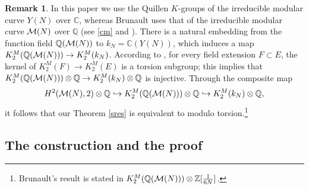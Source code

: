 \documentclass[12pt,amstex,amssymb]{article}
\theoremstyle{plain}
\theoremstyle{definition}
\newtheorem{remark}[theorem]{Remark}
\def\cM{{\cal M}}
\def\Z{{\mathbb Z}}
\def\C{{\mathbb C}}
\def\Q{{\mathbb Q}}
\newcommand{\ba}{\mathbf{a}}
\begin{document}
\begin{remark}
In this paper we use the Quillen $K$-groups of the irreducible modular curve $Y(N)$ over $\C$, whereas  Brunault \cite{Bru} uses that of the irreducible modular curve $\cM(N)$ over $\Q$ (see \eqref{cm} and \cite[p. 2]{Bru}). There is a natural embedding from the function field $\Q(\cM(N))$ to $k_N=\C(Y(N))$, which induces a map $K_2^M(\Q(\cM(N))) \to K_2^M(k_N)$. According to \cite[Lemma 6.1.3, Chap 3]{Weibel}, for every field extension $F \subset E$, the kernel of $K_2^M(F) \to K_2^M(E)$
is a torsion subgroup; this implies that $K_2^M(\Q(\cM(N)))\otimes \Q \to K_2^M(k_N)\otimes \Q$ is injective. Through the composite map $$H^2(\cM(N),2)\otimes \Q \hookrightarrow K_2^M(\Q(\cM(N)))\otimes \Q \hookrightarrow K_2^M(k_N)\otimes \Q,$$ it follows that our Theorem \ref{sres} is equivalent to \cite[Theorem 4.1]{Bru2} modulo torsion.\footnote{Brunault's result is stated in $K_2^M(\Q(\cM(N)))\otimes \Z[\frac{1}{6N}]$.}

\end{remark}





\subsection{The construction and the proof}
\end{document}
